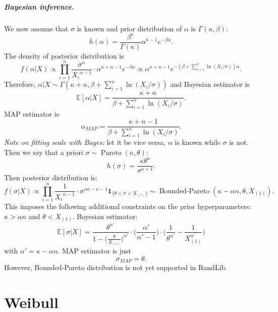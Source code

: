 \documentclass[a4paper,11pt]{article}
\theoremstyle{plain}
\theoremstyle{definition}
\newcommand{\ME}{\mathbb{E}}
\begin{document}
	\subparagraph{Bayesian inference.} We now assume that $\sigma$ is known and prior distribution of $\alpha$ is $\Gamma(\kappa, \beta)$:
	\[
	h(\alpha) = \frac{\beta^\kappa}{\Gamma(\kappa)} \alpha^{\kappa-1}e^{-\beta \alpha}.
	\]
	The density of posterior distribution is
	\[
	f(\alpha | X) \propto \prod_{i=1}^n \frac{\sigma^\alpha}{{X_i}^{\alpha-1}} \cdot \alpha^{\kappa+n-1}e^{-\beta \alpha} \propto \alpha^{\kappa+n-1} e^{ -(\beta + \sum_{i=1}^n \ln (X_i/\sigma))\alpha }.
	\]
	Therefore, $\alpha |X \sim \Gamma(\kappa + n, \beta +\sum_{i=1}^n \ln (X_i/\sigma))$ and Bayesian estimator is
	\[ \ME[\alpha | X] = \frac{\kappa + n}{ \beta +\sum_{i=1}^n \ln (X_i/\sigma) }. \]
	MAP estimator is
	\[ \alpha_{MAP} = \frac{\kappa + n-1}{ \beta +\sum_{i=1}^n \ln (X_i/\sigma) }. \]
	\textit{Note on fitting scale with Bayes:} let it be vice versa, $\alpha$ is known while $\sigma$ is not. Then we say that a priori $\sigma \sim \operatorname{Pareto}(\kappa, \theta)$:
	\[
	h(\sigma) = \frac{\kappa\theta^\kappa}{\sigma^{\kappa+1}}.
	\]
	Then posterior distribution is:
	\[
	f(\sigma|X) \propto \prod_{i=1}^n \frac{1}{{X_i}^{\alpha-1}} \cdot \sigma^{\alpha n - \kappa - 1} \mathbf{1}_{ \{ \theta < \sigma < X_{(1)}\} } \sim \operatorname{Bounded-Pareto}(\kappa-\alpha n, \theta, X_{(1)}).
	\]
	This imposes the following additional constraints on the prior hyperparameters: $\kappa > \alpha n$ and $\theta < X_{(1)}$. Bayesian estimator:
	\[
	\ME[\sigma|X] = \frac{\theta^{\alpha'}}{1-\Big(\frac{\theta}{X_{(1)}}\Big)^{\alpha'}} \cdot \Big(\frac{\alpha'}{\alpha'-1}\Big)\cdot \bigg( \frac{1}{\theta^{\alpha'}} -\frac{1}{X_{(1)}^{\alpha'}} \bigg)
	\]
	with $\alpha'=\kappa - \alpha n$.
	MAP estimator is just
	\[
	\sigma_{MAP} = \theta.
	\]
	However, Bounded-Pareto distribution is not yet supported in RandLib.
	
	
\pagebreak
\section{Weibull}
\end{document}
